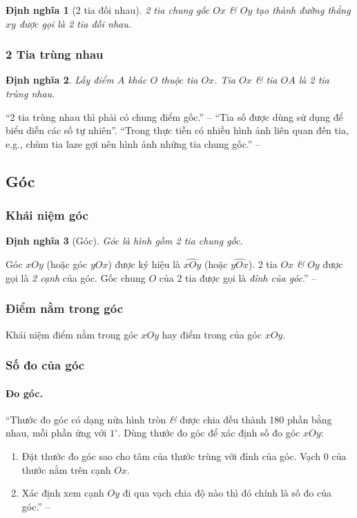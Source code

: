 \documentclass{article}
\numberwithin{equation}{section}
\newtheorem{definition}{Định nghĩa}[section]
\begin{document}
\begin{definition}[2 tia đối nhau]
	2 tia chung gốc $Ox$ \textit{\&} $Oy$ tạo thành đường thẳng $xy$ được gọi là \emph{2 tia đối nhau}.
\end{definition}

\subsubsection{2 Tia trùng nhau}

\begin{definition}
	Lấy điểm $A$ khác $O$ thuộc tia $Ox$. Tia $Ox$ \textit{\&} tia $OA$ là \emph{2 tia trùng nhau}.
\end{definition}
``2 tia trùng nhau thì phải có chung điểm gốc.'' -- \cite[p. 91]{Thai_Anh_Dat_Ha_Loan_Nam_Quang_Toan_6_tap_2} ``Tia số được dùng sử dụng để biểu diễn các số tự nhiên''. ``Trong thực tiễn có nhiều hình ảnh liên quan đến tia, e.g., chùm tia laze gợi nên hình ảnh những tia chung gốc.'' -- \cite[p. 93]{Thai_Anh_Dat_Ha_Loan_Nam_Quang_Toan_6_tap_2}

\subsection{Góc}

\subsubsection{Khái niệm góc}

\begin{definition}[Góc]
	\emph{Góc} là hình gồm 2 tia chung gốc.
\end{definition}
Góc $xOy$  (hoặc góc $yOx$) được ký hiệu là $\widehat{xOy}$ (hoặc $\widehat{yOx}$). 2 tia $Ox$ \textit{\&} $Oy$ được gọi là \textit{2 cạnh} của góc. Gốc chung $O$ của 2 tia được gọi là \textit{đỉnh của góc}.'' -- \cite[p. 94]{Thai_Anh_Dat_Ha_Loan_Nam_Quang_Toan_6_tap_2}

\subsubsection{Điểm nằm trong góc}
Khái niệm điểm nằm trong góc $xOy$ hay điểm trong của góc $xOy$.

\subsubsection{Số đo của góc}

\paragraph{Đo góc.} ``Thước đo góc có dạng nửa hình tròn \textit{\&} được chia đều thành 180 phần bằng nhau, mỗi phần ứng với $1^\circ$. Dùng thước đo góc để xác định số đo góc $xOy$:
\begin{enumerate}
	\item Đặt thước đo góc sao cho tâm của thước trùng với đỉnh của góc. Vạch 0 của thước nằm trên cạnh $Ox$.
	\item Xác định xem cạnh $Oy$ đi qua vạch chia độ nào thì đó chính là số đo của góc.'' -- \cite[p. 96]{Thai_Anh_Dat_Ha_Loan_Nam_Quang_Toan_6_tap_2}
\end{enumerate}
\end{document}
